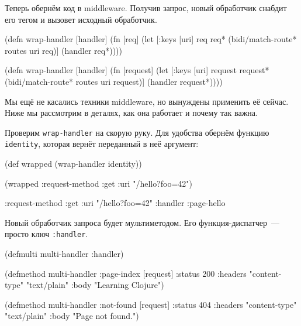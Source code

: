 \fi

Теперь обернём код в middleware. Получив запрос, новый обработчик снабдит его
тегом и вызовет исходный обработчик.

\label{wrap-handler}

\ifnarrow

\begin{english}
  \begin{clojure}
(defn wrap-handler [handler]
  (fn [req]
    (let [{:keys [uri]} req
           req* (bidi/match-route*
                  routes uri req)]
      (handler req*))))
  \end{clojure}
\end{english}

\else

\begin{english}
  \begin{clojure}
(defn wrap-handler [handler]
  (fn [request]
    (let [{:keys [uri]} request
          request* (bidi/match-route* routes uri request)]
      (handler request*))))
  \end{clojure}
\end{english}

\fi

Мы ещё не касались техники middleware, но вынуждены применить её сейчас. Ниже мы
рассмотрим в деталях, как она работает и почему так важна.

Проверим \verb|wrap-handler| на скорую руку. Для удобства обернём функцию
\verb|identity|, которая вернёт переданный в неё аргумент:

\begin{english}
  \begin{clojure}
(def wrapped (wrap-handler identity))

(wrapped {:request-method :get
          :uri "/hello?foo=42"})

{:request-method :get
 :uri "/hello?foo=42"
 :handler :page-hello}
  \end{clojure}
\end{english}



Новый обработчик запроса будет мультиметодом. Его функ\-ция-дис\-пат\-чер~---
просто ключ \verb|:handler|.

\begin{english}
  \begin{clojure}
(defmulti multi-handler
  :handler)

(defmethod multi-handler :page-index
  [request]
  {:status 200
   :headers {"content-type" "text/plain"}
   :body "Learning Clojure"})

(defmethod multi-handler :not-found
  [request]
  {:status 404
   :headers {"content-type" "text/plain"}
   :body "Page not found."})
  \end{clojure}
\end{english}

